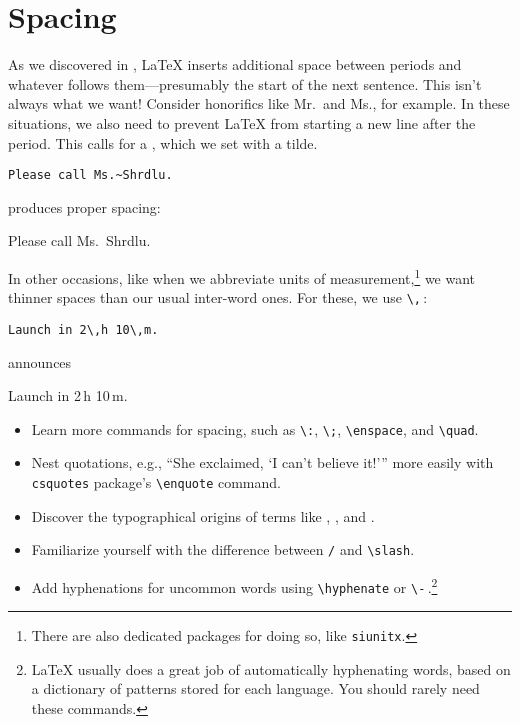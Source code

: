 \section{Spacing}

As we discovered in ,
\LaTeX{} inserts additional space between periods and whatever
follows them---presumably the start of the next sentence.
This isn't always what we want!
Consider honorifics like Mr.\ and Ms., for example.
In these situations, we also need to prevent \LaTeX{} from starting a
new line after the period.
This calls for a , which we set with a tilde.
\begin{leftfigure}
\begin{lstlisting}
Please call Ms.~Shrdlu.
\end{lstlisting}
\end{leftfigure}
produces proper spacing:
\begin{leftfigure}
\lm%
Please call Ms.~Shrdlu.
\end{leftfigure}

In other occasions, like when we abbreviate units of
measurement,\punckern\footnote{There are also dedicated packages for doing so,
like \texttt{siunitx}.}
we want thinner spaces than our usual inter-word ones.
For these, we use \verb|\,|\,:
\begin{leftfigure}
\begin{lstlisting}
Launch in 2\,h 10\,m.
\end{lstlisting}
\end{leftfigure}
announces
\begin{leftfigure}
\lm%
Launch in 2\,h 10\,m.
\end{leftfigure}

\exercises{}
\begin{itemize}
\item Learn more commands for spacing, such as \verb|\:|, \verb|\;|,
    \verb|\enspace|, and \verb|\quad|.
\item Nest quotations, e.g.,
    \enquote{She exclaimed, \enquote{I can't believe it!}}
    more easily with  \texttt{csquotes} package's \verb|\enquote| command.
\item Discover the typographical origins of terms like ,
    , and .
\item Familiarize yourself with the difference between \texttt{/} and
    \verb|\slash|.
\item Add hyphenations for uncommon words using \verb|\hyphenate|
    or \verb|\-|\,.\punckern\footnote{\LaTeX{} usually does a great
    job of automatically hyphenating words, based on a dictionary of patterns
    stored for each language. You should rarely need these commands.}
\end{itemize}
